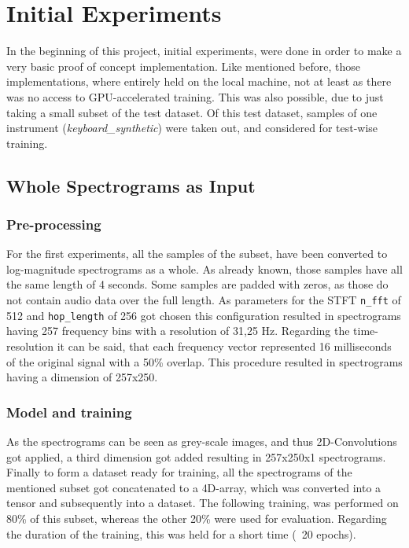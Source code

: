  
\section{Initial Experiments}
\label{sec:exp_init_experiment}
In the beginning of this project, initial experiments, were done in order to make a very basic proof of concept implementation. Like mentioned before, those implementations, where entirely held on the local machine, not at least as there was no access to GPU-accelerated training. This was also possible, due to just taking a small subset of the test dataset. Of this test dataset, samples of one instrument (\textit{keyboard\_synthetic}) were taken out, and considered for test-wise training.

\subsection{Whole Spectrograms as Input}

\subsubsection{Pre-processing}
For the first experiments, all the samples of the subset, have been converted to log-magnitude spectrograms as a whole. As already known, those samples have all the same length of 4 seconds. Some samples are padded with zeros, as those do not contain audio data over the full length. As parameters for the STFT \texttt{n\_fft} of 512 and \texttt{hop\_length} of 256 got chosen this configuration resulted in spectrograms having 257 frequency bins with a resolution of 31,25 Hz. Regarding the time-resolution it can be said, that each frequency vector represented 16 milliseconds of the original signal with a 50\% overlap. This procedure resulted in spectrograms having a dimension of 257x250. 

\subsubsection{Model and training}
As the spectrograms can be seen as grey-scale images, and thus 2D-Convolutions got applied, a third dimension got added resulting in 257x250x1 spectrograms. Finally to form a dataset ready for training, all the spectrograms of the mentioned subset got concatenated to a 4D-array, which was converted into a tensor and subsequently into a dataset. The following training, was performed on 80\% of this subset, whereas the other 20\% were used for evaluation. Regarding the duration of the training, this was held for a short time (~20 epochs).

